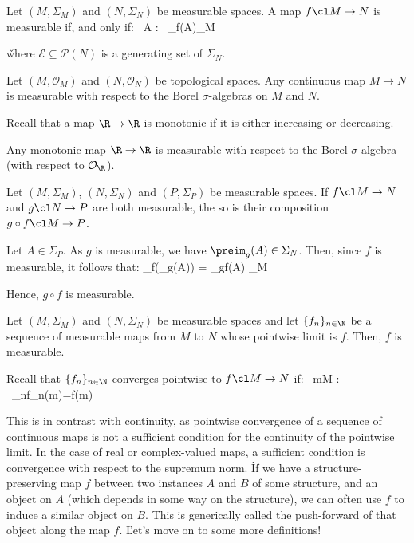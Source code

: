 \bt[]
Let $(M,\Sigma_M)$ and $(N,\Sigma_N)$ be measurable spaces. A map $f\cl M\to N$ is measurable if, and only if:
\bse
\forall \, A\in {} : \ \preim_f(A)\in \Sigma_M
\ese

\v

where $\mathcal{E}\subseteq\mathscr{P}(N)$ is a generating set of $\Sigma_N$.
\et

\bt[]
Let $(M,\mathcal{O}_M)$ and $(N,\mathcal{O}_N)$ be topological spaces. Any continuous map $M\to N$ is measurable with
respect to the Borel $\sigma$-algebras on $M$ and $N$.
\et

Recall that a map $\R\to\R$ is monotonic if it is either increasing or decreasing.

\bt[]
Any monotonic map $\R\to\R$ is measurable with respect to the Borel $\sigma$-algebra (with respect to
$\mathcal{O}_{\R}$).
\et

\bt[]
Let $(M,\Sigma_M)$, $(N,\Sigma_N)$ and $(P,\Sigma_P)$ be measurable spaces. If $f\cl M\to N$ and $g\cl N\to P$ are
both measurable, the so is their composition $g \circ f\cl M\to P$.
\et

\bq
Let $A\in \Sigma_P$. As $g$ is measurable, we have $\preim_g(A)\in\Sigma_N$. Then, since $f$ is measurable, it
follows that:
\bse
\preim_f(\preim_g(A)) = \preim_{g\circ f}(A) \in \Sigma_M
\ese

Hence, $g\circ f$ is measurable.
\eq

\bt[]
Let $(M,\Sigma_M)$ and $(N,\Sigma_N)$ be measurable spaces and let $\{f_n\}_{n\in\N}$ be a sequence of measurable
maps from $M$ to $N$ whose pointwise limit is $f$. Then, $f$ is measurable.
\et

Recall that $\{f_n\}_{n\in\N}$ converges pointwise to $f\cl M\to N$ if:
\bse
\forall \, m\in M : \ \lim_{n\to \infty}f_n(m)=f(m)
\ese

This is in contrast with continuity, as pointwise convergence of a sequence of continuous maps is not a sufficient
condition for the continuity of the pointwise limit. In the case of real or complex-valued maps, a sufficient
condition is convergence with respect to the supremum norm. \v

If we have a structure-preserving map $f$ between two instances $A$ and $B$ of some structure, and an object on $A$
(which depends in some way on the structure), we can often use $f$ to induce a similar object on $B$. This is
generically called the push-forward of that object along the map $f$. \v

Let's move on to some more definitions!

